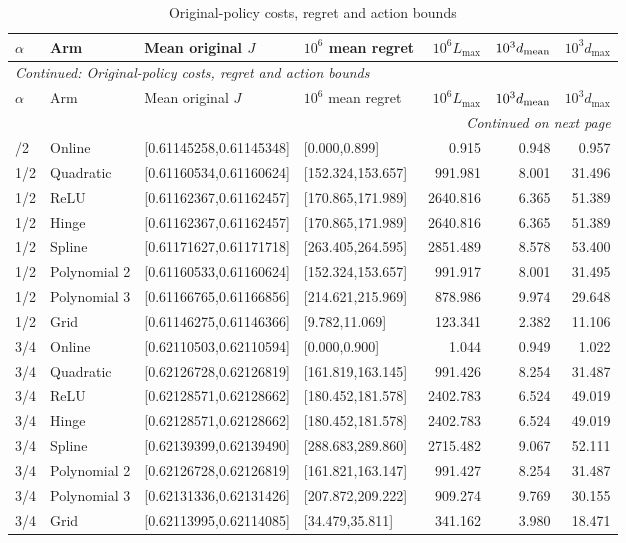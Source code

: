 \begingroup\footnotesize\setlength{\tabcolsep}{3pt}
\begin{longtable}{llllrrr}
\caption{Original-policy costs, regret and action bounds}\label{tab:economics119c}\\
\toprule
$\alpha$ & Arm & Mean original $J$ & $10^6$ mean regret & $10^6 L_{\max}$ & $10^3d_{\rm mean}$ & $10^3d_{\max}$\\\midrule
\endfirsthead
\multicolumn{7}{l}{\textit{Continued: Original-policy costs, regret and action bounds}}\\
\toprule
$\alpha$ & Arm & Mean original $J$ & $10^6$ mean regret & $10^6 L_{\max}$ & $10^3d_{\rm mean}$ & $10^3d_{\max}$\\\midrule
\endhead
\midrule\multicolumn{7}{r}{\textit{Continued on next page}}\\
\endfoot
\bottomrule
\endlastfoot
1/2 & Online & [0.61145258,0.61145348] & [0.000,0.899] & 0.915 & 0.948 & 0.957 \\
1/2 & Quadratic & [0.61160534,0.61160624] & [152.324,153.657] & 991.981 & 8.001 & 31.496 \\
1/2 & ReLU & [0.61162367,0.61162457] & [170.865,171.989] & 2640.816 & 6.365 & 51.389 \\
1/2 & Hinge & [0.61162367,0.61162457] & [170.865,171.989] & 2640.816 & 6.365 & 51.389 \\
1/2 & Spline & [0.61171627,0.61171718] & [263.405,264.595] & 2851.489 & 8.578 & 53.400 \\
1/2 & Polynomial 2 & [0.61160533,0.61160624] & [152.324,153.657] & 991.917 & 8.001 & 31.495 \\
1/2 & Polynomial 3 & [0.61166765,0.61166856] & [214.621,215.969] & 878.986 & 9.974 & 29.648 \\
1/2 & Grid & [0.61146275,0.61146366] & [9.782,11.069] & 123.341 & 2.382 & 11.106 \\
3/4 & Online & [0.62110503,0.62110594] & [0.000,0.900] & 1.044 & 0.949 & 1.022 \\
3/4 & Quadratic & [0.62126728,0.62126819] & [161.819,163.145] & 991.426 & 8.254 & 31.487 \\
3/4 & ReLU & [0.62128571,0.62128662] & [180.452,181.578] & 2402.783 & 6.524 & 49.019 \\
3/4 & Hinge & [0.62128571,0.62128662] & [180.452,181.578] & 2402.783 & 6.524 & 49.019 \\
3/4 & Spline & [0.62139399,0.62139490] & [288.683,289.860] & 2715.482 & 9.067 & 52.111 \\
3/4 & Polynomial 2 & [0.62126728,0.62126819] & [161.821,163.147] & 991.427 & 8.254 & 31.487 \\
3/4 & Polynomial 3 & [0.62131336,0.62131426] & [207.872,209.222] & 909.274 & 9.769 & 30.155 \\
3/4 & Grid & [0.62113995,0.62114085] & [34.479,35.811] & 341.162 & 3.980 & 18.471 \\
\end{longtable}
